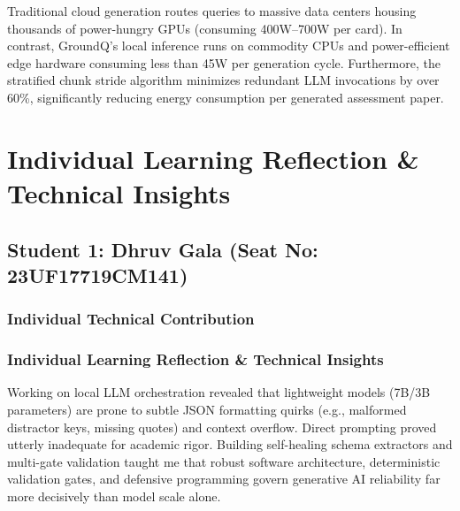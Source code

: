 \documentclass[12pt,a4paper]{report}
\begin{document}
Traditional cloud generation routes queries to massive data centers housing thousands of power-hungry GPUs (consuming 400W--700W per card). In contrast, GroundQ's local inference runs on commodity CPUs and power-efficient edge hardware consuming less than 45W per generation cycle. Furthermore, the stratified chunk stride algorithm minimizes redundant LLM invocations by over 60\%, significantly reducing energy consumption per generated assessment paper.


\chapter{Individual Learning Reflection \& Technical Insights}

\section{Student 1: Dhruv Gala (Seat No: 23UF17719CM141)}

\subsection{Individual Technical Contribution}

\subsection{Individual Learning Reflection \& Technical Insights}
Working on local LLM orchestration revealed that lightweight models (7B/3B parameters) are prone to subtle JSON formatting quirks (e.g., malformed distractor keys, missing quotes) and context overflow. Direct prompting proved utterly inadequate for academic rigor. Building self-healing schema extractors and multi-gate validation taught me that robust software architecture, deterministic validation gates, and defensive programming govern generative AI reliability far more decisively than model scale alone.
\end{document}
